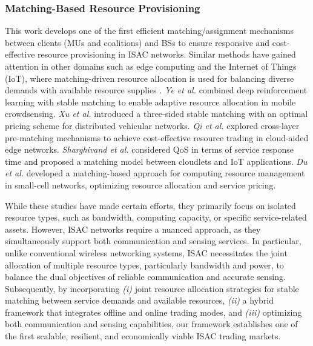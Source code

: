 \subsubsection{Matching-Based Resource Provisioning}
This work develops one of the first efficient matching/assignment mechanisms between clients (MUs and coalitions) and BSs to ensure responsive and cost-effective resource provisioning in ISAC networks. Similar methods have gained attention in other domains such as edge computing and the Internet of Things (IoT), where matching-driven resource allocation is used for balancing diverse demands with available resource supplies \cite{RW Matching1,RW Matching2,RW Matching3,RW Matching4,RW Matching5}. \textit{Ye et al.} \cite{RW Matching1} combined deep reinforcement learning with stable matching to enable adaptive resource allocation in mobile crowdsensing. \textit{Xu et al.} \cite{RW Matching2} introduced a three-sided stable matching with an optimal pricing scheme for distributed vehicular networks. \textit{Qi et al.} \cite{RW Matching3} explored cross-layer pre-matching mechanisms to achieve cost-effective resource trading in cloud-aided edge networks. \textit{Sharghivand et al.} \cite{RW Matching4} considered QoS in terms of service response time and proposed a matching model between cloudlets and IoT applications. \textit{Du et al.} \cite{RW Matching5} developed a matching-based approach for computing resource management in small-cell networks, optimizing resource allocation and service pricing.

While these studies have made certain efforts, they primarily focus on isolated resource types, such as bandwidth, computing capacity, or specific service-related assets. However, ISAC networks require a nuanced approach, as they simultaneously support both communication and sensing services. In particular, unlike conventional wireless networking systems, ISAC necessitates the joint allocation of multiple resource types, particularly bandwidth and power, to balance the dual objectives of reliable communication and accurate sensing. Subsequently, by incorporating \textit{(i)} joint resource allocation strategies for stable matching between service demands and available resources, \textit{(ii)} a hybrid framework that integrates offline and online trading modes, and \textit{(iii)} optimizing both communication and sensing capabilities, our framework establishes one of the first scalable, resilient, and economically viable ISAC trading markets.

\vspace{-4mm}